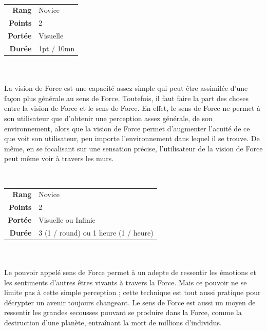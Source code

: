 \begin{description}[align=left] 
    \item [Vision de Force] ~ \\

        \begin{tabular}{ r l }
            \textbf{Rang}    & Novice \\
            \textbf{Points}  & 2 \\
            \textbf{Portée}  & Visuelle \\
            \textbf{Durée}   & 1pt / 10mn \\
        \end{tabular}
        \\ \\
        La vision de Force est une capacité assez simple qui peut être assimilée d’une façon plus générale au sens de Force. Toutefois, il faut faire la part des choses entre la vision de Force et le sens de Force. En effet, le sens de Force ne permet à son utilisateur que d’obtenir une perception assez générale, de son environnement, alors que la vision de Force permet d’augmenter l’acuité de ce que voit son utilisateur, peu importe l’environnement dans lequel il se trouve. De même, en se focalisant sur une sensation précise, l’utilisateur de la vision de Force peut même voir à travers les murs.
        \\

    \item [Sens de Force] ~ \\

        \begin{tabular}{ r l }
            \textbf{Rang}    & Novice \\
            \textbf{Points}  & 2 \\
            \textbf{Portée}  & Visuelle ou Infinie \\
            \textbf{Durée}   & 3 (1 / round) ou 1 heure (1 / heure) \\
        \end{tabular}
        \\ \\
        Le pouvoir appelé sens de Force permet à un adepte de ressentir les émotions et les sentiments d’autres êtres vivants à travers la Force. Mais ce pouvoir ne se limite pas à cette simple perception ; cette technique est tout aussi pratique pour décrypter un avenir toujours changeant. Le sens de Force est aussi un moyen de ressentir les grandes secousses pouvant se produire dans la Force, comme la destruction d’une planète, entraînant la mort de millions d’individus. 


\end{description}
